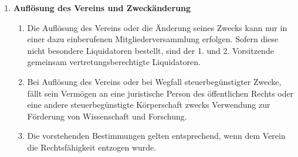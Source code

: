 \documentclass{article}
\begin{document}
\begin{enumerate}[§ 1.]
\item \textsf{\textbf{Auflösung des Vereins und Zweckänderung}}
	\begin{enumerate}[1.]
	\item Die Auflösung des Vereins oder die Änderung seines Zwecks
kann nur in einer dazu einberufenen Mitgliederversammlung erfolgen. Sofern
diese nicht besondere Liquidatoren bestellt, sind der 1. und 2. Vorsitzende
gemeinsam vertretungsberechtigte Liquidatoren. 
	\item Bei Auflösung des Vereins oder bei Wegfall steuerbegünstigter Zwecke, fällt sein Vermögen an eine juristische Person des öffentlichen Rechts oder eine andere steuerbegünstigte Körperschaft zwecks Verwendung zur Förderung von Wissenschaft und Forschung.
	\item Die vorstehenden Bestimmungen gelten entsprechend, wenn dem Verein die Rechtsfähigkeit entzogen wurde.
	\end{enumerate}

\end{enumerate}
\end{document}

